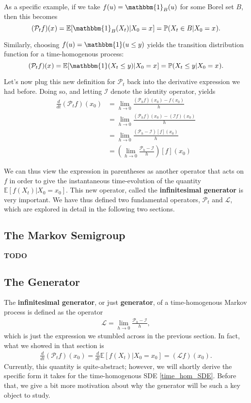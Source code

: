 \documentclass[12pt]{article}
\newcommand{\E}{\mathbb{E}}
\newcommand{\Prob}{\mathbb{P}}
\newcommand{\state}[1][t]{X_{#1}}
\newcommand{\stateValue}[1][t]{x_{#1}}
\newcommand{\op}[1][t]{\mathcal{P}_{#1}} %
\newcommand{\opId}{\mathcal{I}} %
\newcommand{\gen}{\mathcal{L}} %
\begin{document}
As a specific example, if we take $f(u) = \mathbbm{1}_B(u)$ for some Borel set $B$, then this becomes 
\[
(\op f)(\stateValue[]) = \E[\mathbbm{1}_B(\state) | \state[0] = \stateValue[]] = \Prob(\state \in B | \state[0] = \stateValue[]).
\]

Similarly, choosing $f(u) = \mathbbm{1}(u \leq y)$ yields the transition distribution function for a time-homogenous process:
\[
(\op f)(\stateValue[]) = \E[\mathbbm{1}(\state \leq y) | \state[0] = \stateValue[]] = \Prob(\state \leq y | \state[0] = \stateValue[]).
\]

Let's now plug this new definition for $\op$ back into the derivative expression we had before. Doing so, and letting $\opId$ denote the identity operator, yields 
\begin{align*}
\frac{d}{dt} (\op f)(\stateValue[0]) 
&= \lim_{h \to 0} \frac{(\op[h] f)(\stateValue[0]) - f(\stateValue[0])}{h} \\
&= \lim_{h \to 0} \frac{(\op[h] f)(\stateValue[0]) - (\opId f)(\stateValue[0])}{h} \\
&= \lim_{h \to 0} \frac{(\op[h] - \opId)[f](\stateValue[0])}{h} \\
&= \left(\lim_{h \to 0} \frac{\op[h] - \opId}{h}\right)[f](\stateValue[0])
\end{align*}

We can thus view the expression in parentheses as another operator that acts on $f$ in order to give the instantaneous time-evolution of the quantity 
$\E[f(\state) | \state[0] = \stateValue[0]]$. This new operator, called the \textbf{infinitesimal generator} is very important. We have thus defined 
two fundamental operators, $\op$ and $\gen$, which are explored in detail in the following two sections. 

\subsection{The Markov Semigroup}
\textbf{TODO} 

\subsection{The Generator}
The \textbf{infinitesimal generator}, or just \textbf{generator}, of a time-homogenous Markov process is defined as the operator
\begin{align}
\gen = \lim_{h \to 0} \frac{\op[h] - \opId}{h},
\end{align}
which is just the expression we stumbled across in the previous section. In fact, what we showed in that section is 
\begin{align}
\frac{d}{dt} (\op f)(\stateValue[0]) = \frac{d}{dt} \E[f(\state) | \state[0] = \stateValue[0]] = (\gen f)(\stateValue[0]). \label{generator_time_deriv}
\end{align}
Currently, this quantity is quite-abstract; however, we will shortly derive the specific form it takes for the time-homogenous SDE \ref{time_hom_SDE}. Before that, 
we give a bit more motivation about why the generator will be such a key object to study. 
\end{document}
